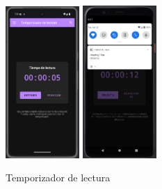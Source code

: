 \documentclass[a4paper,11pt]{report}
\begin{document}
      \begin{figure}[H]
        \centering
        \includegraphics[width=0.25\textwidth]{.img/temporizador.png}
        \hspace{2cm}
        \includegraphics[width=0.25\textwidth]{.img/temporizador_2.png}
        \caption{Temporizador de lectura}
        \label{fig:temporizador}
      \end{figure}
\end{document}
